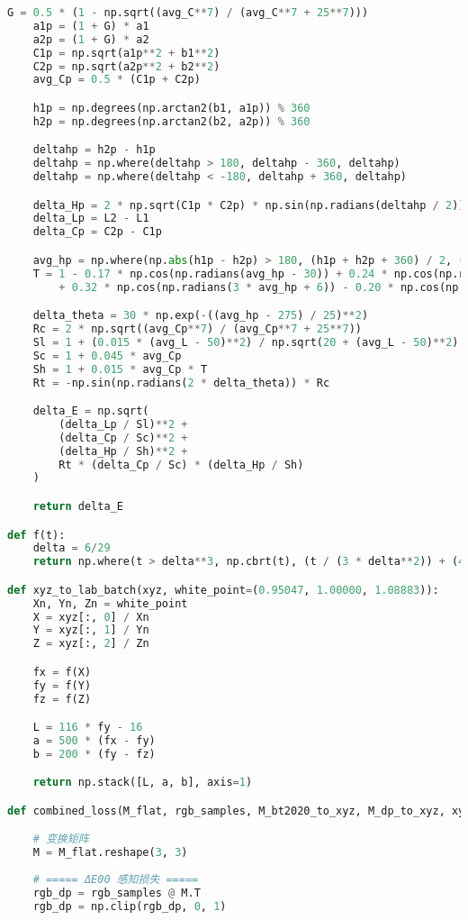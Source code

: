 \begin{lstlisting}[language=Python]
    G = 0.5 * (1 - np.sqrt((avg_C**7) / (avg_C**7 + 25**7)))
    a1p = (1 + G) * a1
    a2p = (1 + G) * a2
    C1p = np.sqrt(a1p**2 + b1**2)
    C2p = np.sqrt(a2p**2 + b2**2)
    avg_Cp = 0.5 * (C1p + C2p)

    h1p = np.degrees(np.arctan2(b1, a1p)) % 360
    h2p = np.degrees(np.arctan2(b2, a2p)) % 360

    deltahp = h2p - h1p
    deltahp = np.where(deltahp > 180, deltahp - 360, deltahp)
    deltahp = np.where(deltahp < -180, deltahp + 360, deltahp)

    delta_Hp = 2 * np.sqrt(C1p * C2p) * np.sin(np.radians(deltahp / 2))
    delta_Lp = L2 - L1
    delta_Cp = C2p - C1p

    avg_hp = np.where(np.abs(h1p - h2p) > 180, (h1p + h2p + 360) / 2, (h1p + h2p) / 2)
    T = 1 - 0.17 * np.cos(np.radians(avg_hp - 30)) + 0.24 * np.cos(np.radians(2 * avg_hp)) \
        + 0.32 * np.cos(np.radians(3 * avg_hp + 6)) - 0.20 * np.cos(np.radians(4 * avg_hp - 63))

    delta_theta = 30 * np.exp(-((avg_hp - 275) / 25)**2)
    Rc = 2 * np.sqrt((avg_Cp**7) / (avg_Cp**7 + 25**7))
    Sl = 1 + (0.015 * (avg_L - 50)**2) / np.sqrt(20 + (avg_L - 50)**2)
    Sc = 1 + 0.045 * avg_Cp
    Sh = 1 + 0.015 * avg_Cp * T
    Rt = -np.sin(np.radians(2 * delta_theta)) * Rc

    delta_E = np.sqrt(
        (delta_Lp / Sl)**2 +
        (delta_Cp / Sc)**2 +
        (delta_Hp / Sh)**2 +
        Rt * (delta_Cp / Sc) * (delta_Hp / Sh)
    )

    return delta_E

def f(t):
    delta = 6/29
    return np.where(t > delta**3, np.cbrt(t), (t / (3 * delta**2)) + (4/29))

def xyz_to_lab_batch(xyz, white_point=(0.95047, 1.00000, 1.08883)):
    Xn, Yn, Zn = white_point
    X = xyz[:, 0] / Xn
    Y = xyz[:, 1] / Yn
    Z = xyz[:, 2] / Zn

    fx = f(X)
    fy = f(Y)
    fz = f(Z)

    L = 116 * fy - 16
    a = 500 * (fx - fy)
    b = 200 * (fy - fz)

    return np.stack([L, a, b], axis=1)

def combined_loss(M_flat, rgb_samples, M_bt2020_to_xyz, M_dp_to_xyz, xyz_to_lab_batch):

    # 变换矩阵
    M = M_flat.reshape(3, 3)
    
    # ===== ΔE00 感知损失 =====
    rgb_dp = rgb_samples @ M.T
    rgb_dp = np.clip(rgb_dp, 0, 1)


\end{lstlisting}
